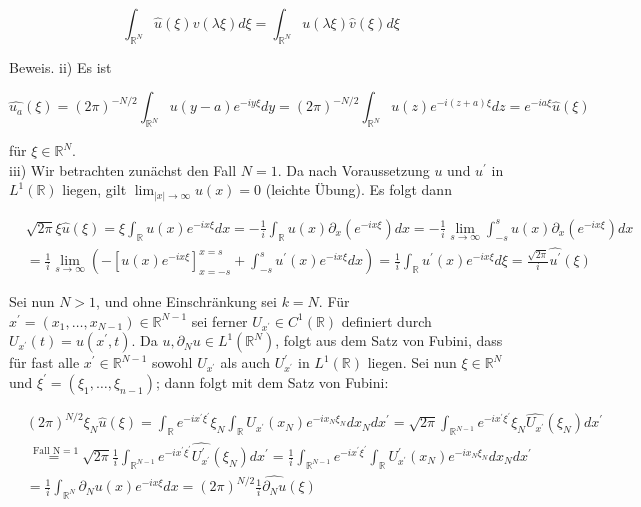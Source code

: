 \documentclass[10pt, letterpaper]{article}
\begin{document}
$$
\int_{\mathbb{R}^{N}} \hat{u}(\xi) v(\lambda \xi) d \xi=\int_{\mathbb{R}^{N}} u(\lambda \xi) \hat{v}(\xi) d \xi
$$

Beweis. ii) Es ist

$$
\widehat{u_{a}}(\xi)=(2 \pi)^{-N / 2} \int_{\mathbb{R}^{N}} u(y-a) e^{-i y \xi} d y=(2 \pi)^{-N / 2} \int_{\mathbb{R}^{N}} u(z) e^{-i(z+a) \xi} d z=e^{-i a \xi} \hat{u}(\xi)
$$

für $\xi \in \mathbb{R}^{N}$.\\
iii) Wir betrachten zunächst den Fall $N=1$. Da nach Voraussetzung $u$ und $u^{\prime}$ in $L^{1}(\mathbb{R})$ liegen, gilt $\lim _{|x| \rightarrow \infty} u(x)=0$ (leichte Übung). Es folgt dann

$$
\begin{aligned}
& \sqrt{2 \pi} \xi \hat{u}(\xi)=\xi \int_{\mathbb{R}} u(x) e^{-i x \xi} d x=-\frac{1}{i} \int_{\mathbb{R}} u(x) \partial_{x}\left(e^{-i x \xi}\right) d x=-\frac{1}{i} \lim _{s \rightarrow \infty} \int_{-s}^{s} u(x) \partial_{x}\left(e^{-i x \xi}\right) d x \\
& =\frac{1}{i} \lim _{s \rightarrow \infty}\left(-\left[u(x) e^{-i x \xi}\right]_{x=-s}^{x=s}+\int_{-s}^{s} u^{\prime}(x) e^{-i x \xi} d x\right)=\frac{1}{i} \int_{\mathbb{R}} u^{\prime}(x) e^{-i x \xi} d \xi=\frac{\sqrt{2 \pi}}{i} \widehat{u^{\prime}}(\xi)
\end{aligned}
$$

Sei nun $N>1$, und ohne Einschränkung sei $k=N$. Für $x^{\prime}=\left(x_{1}, \ldots, x_{N-1}\right) \in \mathbb{R}^{N-1}$ sei ferner $U_{x^{\prime}} \in C^{1}(\mathbb{R})$ definiert durch $U_{x^{\prime}}(t)=u\left(x^{\prime}, t\right)$. Da $u, \partial_{N} u \in L^{1}\left(\mathbb{R}^{N}\right)$, folgt aus dem Satz von Fubini, dass für fast alle $x^{\prime} \in \mathbb{R}^{N-1}$ sowohl $U_{x^{\prime}}$ als auch $U_{x^{\prime}}^{\prime}$ in $L^{1}(\mathbb{R})$ liegen. Sei nun $\xi \in \mathbb{R}^{N}$ und $\xi^{\prime}=\left(\xi_{1}, \ldots, \xi_{n-1}\right)$; dann folgt mit dem Satz von Fubini:

$$
\begin{aligned}
& (2 \pi)^{N / 2} \xi_{N} \hat{u}(\xi)=\int_{\mathbb{R}} e^{-i x^{\prime} \xi^{\prime}} \xi_{N} \int_{\mathbb{R}} U_{x^{\prime}}\left(x_{N}\right) e^{-i x_{N} \xi_{N}} d x_{N} d x^{\prime}=\sqrt{2 \pi} \int_{\mathbb{R}^{N-1}} e^{-i x^{\prime} \xi^{\prime}} \xi_{N} \widehat{U_{x^{\prime}}}\left(\xi_{N}\right) d x^{\prime} \\
& \stackrel{\text { Fall } \mathrm{N}=1}{=} \sqrt{2 \pi} \frac{1}{i} \int_{\mathbb{R}^{N-1}} e^{-i x^{\prime} \xi^{\prime}} \widehat{U_{x^{\prime}}^{\prime}}\left(\xi_{N}\right) d x^{\prime}=\frac{1}{i} \int_{\mathbb{R}^{N-1}} e^{-i x^{\prime} \xi^{\prime}} \int_{\mathbb{R}} U_{x^{\prime}}^{\prime}\left(x_{N}\right) e^{-i x_{N} \xi_{N}} d x_{N} d x^{\prime} \\
& =\frac{1}{i} \int_{\mathbb{R}^{N}} \partial_{N} u(x) e^{-i x \xi} d x=(2 \pi)^{N / 2} \frac{1}{i} \widehat{\partial_{N} u}(\xi)
\end{aligned}
$$
\end{document}
